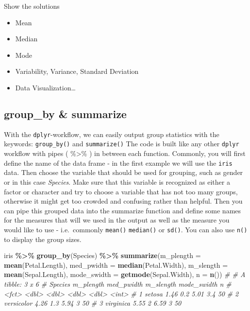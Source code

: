 \documentclass[
]{book}
\newenvironment{Shaded}{\begin{snugshade}}{\end{snugshade}}
\newcommand{\AttributeTok}[1]{\textcolor[rgb]{0.13,0.29,0.53}{#1}}
\newcommand{\CommentTok}[1]{\textcolor[rgb]{0.56,0.35,0.01}{\textit{#1}}}
\newcommand{\FunctionTok}[1]{\textcolor[rgb]{0.13,0.29,0.53}{\textbf{#1}}}
\newcommand{\NormalTok}[1]{#1}
\newcommand{\SpecialCharTok}[1]{\textcolor[rgb]{0.81,0.36,0.00}{\textbf{#1}}}
\providecommand{\tightlist}{%
  \setlength{\itemsep}{0pt}\setlength{\parskip}{0pt}}
\begin{document}
Show the solutions

\begin{itemize}
\tightlist
\item
  Mean
\item
  Median
\item
  Mode
\item
  Variability, Variance, Standard Deviation
\item
  Data Visualization\ldots{}
\end{itemize}

\subsection{group\_by \& summarize}\label{group_by-summarize-1}

With the \texttt{dplyr}-workflow, we can easily output group statistics with the keywords: \texttt{group\_by()} and \texttt{summarize()}
The code is built like any other \texttt{dplyr} workflow with pipes ( \%\textgreater\% ) in between each function.
Commonly, you will first define the name of the data frame - in the first example we will use the \texttt{iris} data.
Then choose the variable that should be used for grouping, such as gender or in this case \emph{Species}.
Make sure that this variable is recognized as either a factor or character and try to choose a variable that has not too many groups, otherwise it might get too crowded and confusing rather than helpful.
Then you can pipe this grouped data into the summarize function and define some names for the measures that will we used in the output as well as the measure you would like to use - i.e.~commonly \texttt{mean()} \texttt{median()} or \texttt{sd()}.
You can also use \texttt{n()} to display the group sizes.

\begin{Shaded}
\begin{Highlighting}[]
\NormalTok{iris }\SpecialCharTok{\%\textgreater{}\%} 
  \FunctionTok{group\_by}\NormalTok{(Species) }\SpecialCharTok{\%\textgreater{}\%} 
  \FunctionTok{summarize}\NormalTok{(}\AttributeTok{m\_plength =} \FunctionTok{mean}\NormalTok{(Petal.Length),}
            \AttributeTok{med\_pwidth =} \FunctionTok{median}\NormalTok{(Petal.Width),}
            \AttributeTok{m\_slength =} \FunctionTok{mean}\NormalTok{(Sepal.Length),}
            \AttributeTok{mode\_swidth =} \FunctionTok{getmode}\NormalTok{(Sepal.Width),}
            \AttributeTok{n =} \FunctionTok{n}\NormalTok{())}
\CommentTok{\# \# A tibble: 3 x 6}
\CommentTok{\#   Species    m\_plength med\_pwidth m\_slength mode\_swidth     n}
\CommentTok{\#   \textless{}fct\textgreater{}          \textless{}dbl\textgreater{}      \textless{}dbl\textgreater{}     \textless{}dbl\textgreater{}       \textless{}dbl\textgreater{} \textless{}int\textgreater{}}
\CommentTok{\# 1 setosa          1.46        0.2      5.01         3.4    50}
\CommentTok{\# 2 versicolor      4.26        1.3      5.94         3      50}
\CommentTok{\# 3 virginica       5.55        2        6.59         3      50}
\end{Highlighting}
\end{Shaded}
\end{document}
